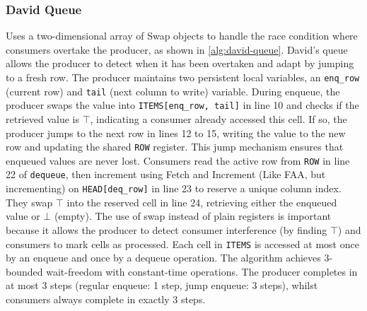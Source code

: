 \subsubsection{David Queue}\label{subsubsec:david-queue}
Uses a two-dimensional array of Swap objects to handle the race condition where consumers overtake the producer, as shown in \cref{alg:david-queue}. David's queue allows the producer to detect when it has been overtaken and adapt by jumping to a fresh row. The producer maintains two persistent local variables, an \texttt{enq\_row} (current row) and \texttt{tail} (next column to write) variable. During enqueue, the producer swaps the value into \texttt{ITEMS[enq\_row, tail]} in line 10 and checks if the retrieved value is $\top$, indicating a consumer already accessed this cell. If so, the producer jumps to the next row in lines 12 to 15, writing the value to the new row and updating the shared \texttt{ROW} register. This jump mechanism ensures that enqueued values are never lost. Consumers read the active row from \texttt{ROW} in line 22 of \texttt{dequeue}, then increment using Fetch and Increment (Like \ac{FAA}, but incrementing) on \texttt{HEAD[deq\_row]} in line 23 to reserve a unique column index. They swap $\top$ into the reserved cell in line 24, retrieving either the enqueued value or $\bot$ (empty). The use of swap instead of plain registers is important because it allows the producer to detect consumer interference (by finding $\top$) and consumers to mark cells as processed. Each cell in \texttt{ITEMS} is accessed at most once by an enqueue and once by a dequeue operation. The algorithm achieves 3-bounded wait-freedom with constant-time operations. The producer completes in at most 3 steps (regular enqueue: 1 step, jump enqueue: 3 steps), whilst consumers always complete in exactly 3 steps. \cite{Mateíspmc}

